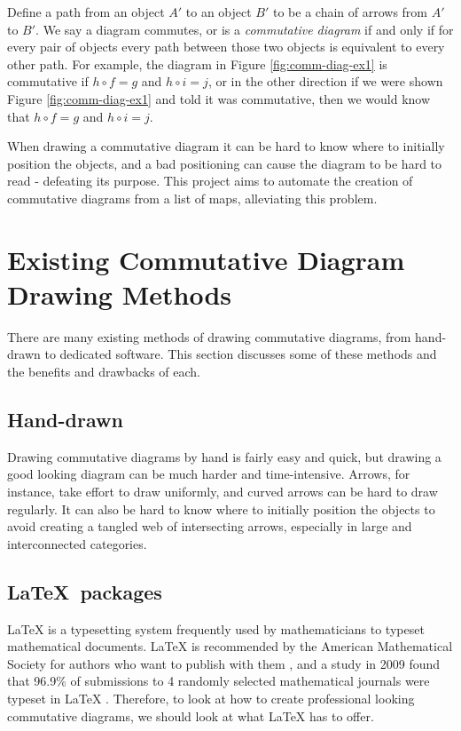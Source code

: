 \documentclass[logo,bsc,singlespacing,parskip]{infthesis}
\theoremstyle{definition}
\begin{document}
Define a path from an object $A'$ to an object $B'$ to be a chain of arrows from $A'$ to $B'$. We say a diagram commutes, or is a \emph{commutative diagram} if and only if for every pair of objects every path between those two objects is equivalent to every other path. For example, the diagram in Figure \ref{fig:comm-diag-ex1} is commutative if $h \circ f = g$ and $h \circ i = j$, or in the other direction if we were shown Figure \ref{fig:comm-diag-ex1} and told it was commutative, then we would know that $h \circ f = g$ and $h \circ i = j$.


When drawing a commutative diagram it can be hard to know where to initially position the objects, and a bad positioning can cause the diagram to be hard to read - defeating its purpose. This project aims to automate the creation of commutative diagrams from a list of maps, alleviating this problem.

\section{Existing Commutative Diagram Drawing Methods}\label{bkg:other}
There are many existing methods of drawing commutative diagrams, from hand-drawn to dedicated software. This section discusses some of these methods and the benefits and drawbacks of each.

\subsection{Hand-drawn}
Drawing commutative diagrams by hand is fairly easy and quick, but drawing a good looking diagram can be much harder and time-intensive. Arrows, for instance, take effort to draw uniformly, and curved arrows can be hard to draw regularly. It can also be hard to know where to initially position the objects to avoid creating a tangled web of intersecting arrows, especially in large and interconnected categories. 

\subsection{\LaTeX\ packages}
\LaTeX{} is a typesetting system frequently used by mathematicians to typeset mathematical documents. \LaTeX{} is recommended by the American Mathematical Society for authors who want to publish with them \cite{AMSlatexrec}, and a study in 2009 found that 96.9\% of submissions to 4 randomly selected mathematical journals were typeset in \LaTeX{} \cite{brischoux2009don}. Therefore, to look at how to create professional looking commutative diagrams, we should look at what \LaTeX{} has to offer.
\end{document}
